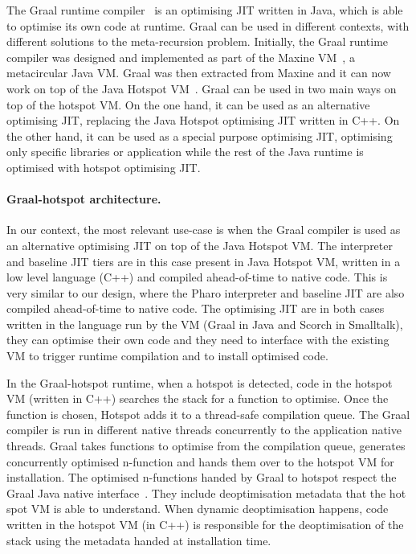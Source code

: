 \documentclass[a4paper,12pt,twoside]{../includes/ThesisStyle}
\begin{document}
The Graal runtime compiler~\cite{Oracle13,Dubo13c} is an optimising JIT written in Java, which is able to optimise its own code at runtime. Graal can be used in different contexts, with different solutions to the meta-recursion problem. Initially, the Graal runtime compiler was designed and implemented as part of the Maxine VM~\cite{Wimm13a}, a metacircular Java VM. Graal was then extracted from Maxine and it can now work on top of the Java Hotspot VM~\cite{Pale01a}. Graal can be used in two main ways on top of the hotspot VM. On the one hand, it can be used as an alternative optimising JIT, replacing the Java Hotspot optimising JIT written in C++. On the other hand, it can be used as a special purpose optimising JIT, optimising only specific libraries or application while the rest of the Java runtime is optimised with hotspot optimising JIT. %

\paragraph{Graal-hotspot architecture.} In our context, the most relevant use-case is when the Graal compiler is used as an alternative optimising JIT on top of the Java Hotspot VM. The interpreter and baseline JIT tiers are in this case present in Java Hotspot VM, written in a low level language (C++) and compiled ahead-of-time to native code. This is very similar to our design, where the Pharo interpreter and baseline JIT are also compiled ahead-of-time to native code. The optimising JIT are in both cases written in the language run by the VM (Graal in Java and Scorch in Smalltalk), they can optimise their own code and they need to interface with the existing VM to trigger runtime compilation and to install optimised code.

In the Graal-hotspot runtime, when a hotspot is detected, code in the hotspot VM (written in C++) searches the stack for a function to optimise. Once the function is chosen, Hotspot adds it to a thread-safe compilation queue. The Graal compiler is run in different native threads concurrently to the application native threads. Graal takes functions to optimise from the compilation queue, generates concurrently optimised n-function and hands them over to the hotspot VM for installation. The optimised n-functions handed by Graal to hotspot respect the Graal Java native interface~\cite{Grim13a}. They include deoptimisation metadata that the hot spot VM is able to understand. When dynamic deoptimisation happens, code written in the hotspot VM (in C++) is responsible for the deoptimisation of the stack using the metadata handed at installation time.
\end{document}
